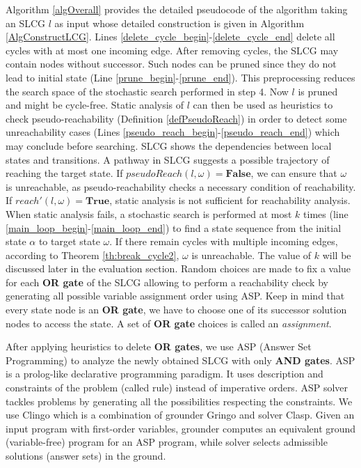 Algorithm \ref{algOverall} provides the detailed pseudocode of the algorithm taking an SLCG $l$ as input whose detailed construction is given in Algorithm \ref{AlgConstructLCG}.
Lines \ref{delete_cycle_begin}-\ref{delete_cycle_end} delete all cycles with at most one incoming edge.
After removing cycles, the SLCG may contain nodes without successor.
Such nodes can be pruned since they do not lead to initial state (Line \ref{prune_begin}-\ref{prune_end}).
This preprocessing reduces the search space of the stochastic search performed in step 4.
Now $l$ is pruned and might be cycle-free.
Static analysis of $l$ can then be used as heuristics to check pseudo-reachability (Definition \ref{defPseudoReach}) in order to detect some unreachability cases (Lines \ref{pseudo_reach_begin}-\ref{pseudo_reach_end}) which may conclude before searching.
SLCG shows the dependencies between local states and transitions. 
A pathway in SLCG suggests a possible trajectory of reaching the target state. 
If $pseudoReach(l,\omega)=\textbf{False}$, we can ensure that $\omega$ is unreachable, as pseudo-reachability checks a necessary condition of reachability.
If $reach'(l,\omega)=\textbf{True}$, static analysis is not sufficient for reachability analysis. 
When static analysis fails, a stochastic search is performed at most $k$ times (line \ref{main_loop_begin}-\ref{main_loop_end}) to find a state sequence from the initial state $\alpha$ to target state $\omega$.
If there remain cycles with multiple incoming edges, according to Theorem \ref{th:break_cycle2}, $\omega$ is unreachable.
The value of $k$ will be discussed later in the evaluation section.
Random choices are made to fix a value for each \textbf{OR gate} of the SLCG allowing to perform a reachability check by generating all possible variable assignment order using ASP.
Keep in mind that every state node is an \textbf{OR gate}, we have to choose one of its successor solution nodes to access the state. 
A set of \textbf{OR gate} choices is called an \textit{assignment}.

After applying heuristics to delete \textbf{OR gates}, we use ASP  (Answer Set Programming) \cite{baral2003knowledge} to analyze the newly obtained SLCG with only \textbf{AND gates}.
ASP is a prolog-like declarative programming paradigm.
It uses description and constraints of the problem (called rule) instead of imperative orders.
ASP solver tackles problems by generating all the possibilities respecting the constraints. 
We use Clingo\cite{gebser2016theory} which is a combination of grounder Gringo and solver Clasp. 
Given an input program with first-order variables, grounder computes an equivalent ground (variable-free) program for an ASP program, while solver selects admissible solutions (answer sets) in the ground.

